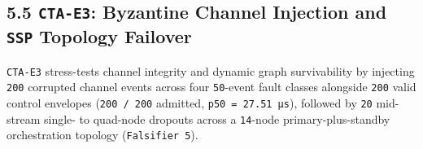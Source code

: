 \documentclass[10pt,letterpaper]{article}
\begin{document}
\subsection{\texorpdfstring{5.5 \texttt{CTA-E3}: Byzantine Channel
Injection and \texttt{SSP} Topology
Failover}{5.5 CTA-E3: Byzantine Channel Injection and SSP Topology Failover}}\label{cta-e3-byzantine-channel-injection-and-ssp-topology-failover}

\texttt{CTA-E3} stress-tests channel integrity and dynamic graph
survivability by injecting \texttt{200} corrupted channel events across
four \texttt{50}-event fault classes alongside \texttt{200} valid
control envelopes (\texttt{200\ /\allowbreak{}\ 200} admitted,
\texttt{p50\ =\ 27.\allowbreak{}51\ µs}), followed by \texttt{20} mid-stream single-
to quad-node dropouts across a \texttt{14}-node primary-plus-standby
orchestration topology (\texttt{Falsifier\ 5}).
\end{document}
